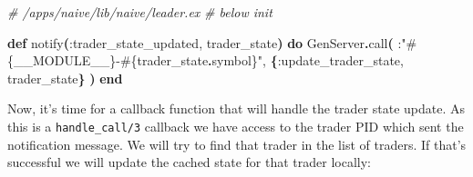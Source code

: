 \documentclass[
  oneside]{book}
\newenvironment{Shaded}{\begin{snugshade}}{\end{snugshade}}
\newcommand{\CommentTok}[1]{\textcolor[rgb]{0.56,0.35,0.01}{\textit{#1}}}
\newcommand{\ConstantTok}[1]{\textcolor[rgb]{0.56,0.35,0.01}{#1}}
\newcommand{\FunctionTok}[1]{\textcolor[rgb]{0.13,0.29,0.53}{\textbf{#1}}}
\newcommand{\KeywordTok}[1]{\textcolor[rgb]{0.13,0.29,0.53}{\textbf{#1}}}
\newcommand{\NormalTok}[1]{#1}
\newcommand{\OperatorTok}[1]{\textcolor[rgb]{0.81,0.36,0.00}{\textbf{#1}}}
\newcommand{\OtherTok}[1]{\textcolor[rgb]{0.56,0.35,0.01}{#1}}
\newcommand{\StringTok}[1]{\textcolor[rgb]{0.31,0.60,0.02}{#1}}
\newcommand{\VariableTok}[1]{\textcolor[rgb]{0.00,0.00,0.00}{#1}}
\begin{document}
\begin{Shaded}
\begin{Highlighting}[]
  \CommentTok{\# /apps/naive/lib/naive/leader.ex}
  \CommentTok{\# below init}

  \KeywordTok{def}\NormalTok{ notify}\FunctionTok{(}\VariableTok{:trader\_state\_updated}\NormalTok{, trader\_state}\FunctionTok{)} \KeywordTok{do}
    \ConstantTok{GenServer}\OperatorTok{.}\NormalTok{call}\FunctionTok{(}
\NormalTok{      :}\StringTok{"}\OtherTok{\#\{}\ConstantTok{\_\_MODULE\_\_}\OtherTok{\}}\StringTok{{-}}\OtherTok{\#\{}\NormalTok{trader\_state}\OperatorTok{.}\NormalTok{symbol}\OtherTok{\}}\StringTok{"}\NormalTok{,}
      \FunctionTok{\{}\VariableTok{:update\_trader\_state}\NormalTok{, trader\_state}\FunctionTok{\}}
    \FunctionTok{)}
  \KeywordTok{end}
\end{Highlighting}
\end{Shaded}

Now, it's time for a callback function that will handle the trader state update. As this is a \texttt{handle\_call/3} callback we have access to the trader PID which sent the notification message. We will try to find that trader in the list of traders. If that's successful we will update the cached state for that
trader locally:
\end{document}
